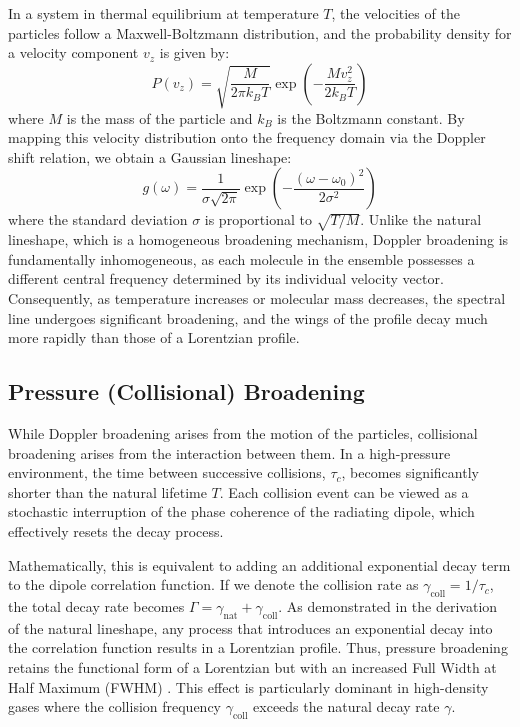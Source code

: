 \documentclass[12pt]{report}
\begin{document}
	In a system in thermal equilibrium at temperature $T$, the velocities of the particles follow a Maxwell-Boltzmann distribution, and the probability density for a velocity component $v_z$ is given by:
	\begin{equation}
		P(v_z) = \sqrt{\frac{M}{2\pi k_B T}} \exp\left( -\frac{M v_z^2}{2 k_B T} \right)
	\end{equation}
	where $M$ is the mass of the particle and $k_B$ is the Boltzmann constant. By mapping this velocity distribution onto the frequency domain via the Doppler shift relation, we obtain a Gaussian lineshape:
	\begin{equation} \label{ls_doppler}
		g(\omega) = \frac{1}{\sigma \sqrt{2\pi}} \exp\left( -\frac{(\omega - \omega_0)^2}{2\sigma^2} \right)
	\end{equation}
	where the standard deviation $\sigma$ is proportional to $\sqrt{T/M}$. Unlike the natural lineshape, which is a homogeneous broadening mechanism, Doppler broadening is fundamentally inhomogeneous, as each molecule in the ensemble possesses a different central frequency determined by its individual velocity vector. Consequently, as temperature increases or molecular mass decreases, the spectral line undergoes significant broadening, and the wings of the profile decay much more rapidly than those of a Lorentzian profile.
	
	\subsection{Pressure (Collisional) Broadening}
	While Doppler broadening arises from the motion of the particles, collisional broadening arises from the interaction between them. In a high-pressure environment, the time between successive collisions, $\tau_c$, becomes significantly shorter than the natural lifetime $T$. Each collision event can be viewed as a stochastic interruption of the phase coherence of the radiating dipole, which effectively resets the decay process.
	
	Mathematically, this is equivalent to adding an additional exponential decay term to the dipole correlation function. If we denote the collision rate as $\gamma_{\text{coll}} = 1/\tau_c$, the total decay rate becomes $\Gamma = \gamma_{\text{nat}} + \gamma_{\text{coll}}$. As demonstrated in the derivation of the natural lineshape, any process that introduces an exponential decay into the correlation function results in a Lorentzian profile. Thus, pressure broadening retains the functional form of a Lorentzian but with an increased Full Width at Half Maximum (FWHM) \cite{book_lasers_siegman}. This effect is particularly dominant in high-density gases where the collision frequency $\gamma_{\text{coll}}$ exceeds the natural decay rate $\gamma$.
	
\end{document}
